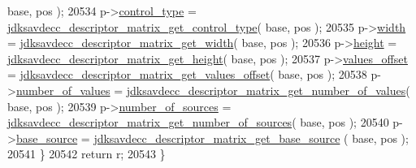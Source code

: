 \begin{DoxyCode}
      base, pos );
20534         p->\hyperlink{structjdksavdecc__descriptor__matrix_affec595f0ec2a4ae7a3cece71d05adcb}{control\_type} = 
      \hyperlink{group__descriptor__matrix_ga419bd3facce1d8294b8661b89312ef45}{jdksavdecc\_descriptor\_matrix\_get\_control\_type}( base, pos );
20535         p->\hyperlink{structjdksavdecc__descriptor__matrix_ad0eab1042455a2067c812ab8071d5376}{width} = \hyperlink{group__descriptor__matrix_ga6459143f0bffb2ae98d4d4964cd7fb40}{jdksavdecc\_descriptor\_matrix\_get\_width}( base,
       pos );
20536         p->\hyperlink{structjdksavdecc__descriptor__matrix_a81c9f8d0b8c3b49d770be14dbe9f0d37}{height} = \hyperlink{group__descriptor__matrix_gab382908e84a397fe7857ab9a89db564f}{jdksavdecc\_descriptor\_matrix\_get\_height}( 
      base, pos );
20537         p->\hyperlink{structjdksavdecc__descriptor__matrix_a2987071ee0b81f35817e48a0dc92ad76}{values\_offset} = 
      \hyperlink{group__descriptor__matrix_gaf0c5627079e77c22445bdadce94963ae}{jdksavdecc\_descriptor\_matrix\_get\_values\_offset}( base, pos );
20538         p->\hyperlink{structjdksavdecc__descriptor__matrix_a1c32421ead62b8a032c4346688cd9b69}{number\_of\_values} = 
      \hyperlink{group__descriptor__matrix_gaff41215b6af4fd5df185b16cdae59c26}{jdksavdecc\_descriptor\_matrix\_get\_number\_of\_values}( base, 
      pos );
20539         p->\hyperlink{structjdksavdecc__descriptor__matrix_a1af3a7f3729937d5da218737ba5b2483}{number\_of\_sources} = 
      \hyperlink{group__descriptor__matrix_gae02dba28cb20ef60be25406cc13ed0bd}{jdksavdecc\_descriptor\_matrix\_get\_number\_of\_sources}( base,
       pos );
20540         p->\hyperlink{structjdksavdecc__descriptor__matrix_a2d8374af2d34db97d440b2e38171dc5f}{base\_source} = \hyperlink{group__descriptor__matrix_gacc8325d51ddfdccfcc1c3db996ace28c}{jdksavdecc\_descriptor\_matrix\_get\_base\_source}
      ( base, pos );
20541     \}
20542     \textcolor{keywordflow}{return} r;
20543 \}
\end{DoxyCode}


